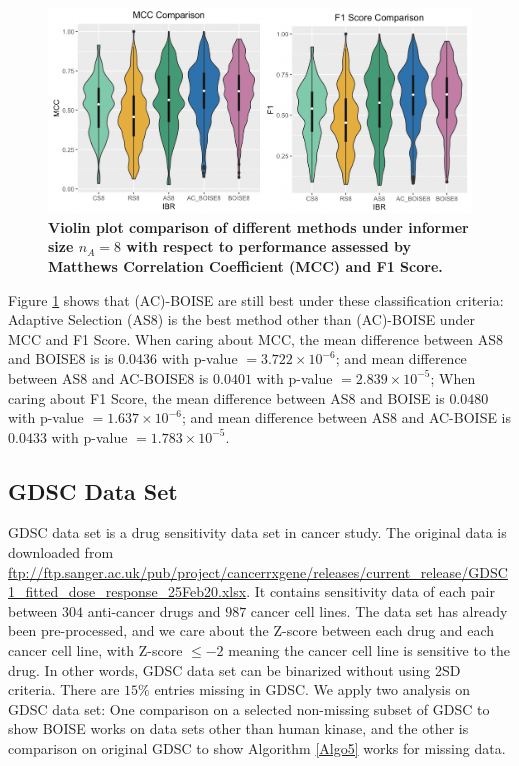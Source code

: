 \documentclass[12pt]{article}
\begin{document}
\begin{figure}[!ht]
\centering
\includegraphics[width=5.0in]{PKIS1_8_mccf1.png}
\caption{\label{fig:mcc} 
{\bf Violin plot comparison of different methods under informer size $n_A =8$ with respect to performance assessed by Matthews Correlation Coefficient (MCC) and F1 Score.} }
\end{figure}


Figure \ref{fig:mcc} shows that (AC)-BOISE are still best under these classification criteria: Adaptive Selection (AS8) is the best method other than (AC)-BOISE  under MCC and F1 Score. When caring about MCC, the mean difference between AS8 and BOISE8 is is $0.0436$ with p-value $=3.722\times 10^{-6}$; and  mean difference between AS8 and AC-BOISE8 is $0.0401$ with p-value $=2.839\times 10^{-5}$; When caring about F1 Score, the mean difference between AS8 and BOISE is $0.0480$ with p-value $=1.637\times 10^{-6}$; and  mean difference between AS8 and AC-BOISE is $0.0433$ with p-value $=1.783\times 10^{-5}$.


\subsection{GDSC Data Set}
GDSC data set is a drug sensitivity data set in cancer study. The original data is downloaded from \url{ftp://ftp.sanger.ac.uk/pub/project/cancerrxgene/releases/current_release/GDSC1_fitted_dose_response_25Feb20.xlsx}. It contains sensitivity data of each pair between $304$ anti-cancer drugs and $987$ cancer cell lines. The data set has already been pre-processed, and we care about the Z-score between each drug and each cancer cell line, with Z-score $\leq -2$ meaning the cancer cell line is sensitive to the drug. In other words, GDSC data set can be binarized without using 2SD criteria. There are $15\%$ entries missing in GDSC. We apply two analysis on GDSC data set: One comparison on a selected non-missing subset of GDSC to show BOISE works on data sets other than human kinase, and the other is comparison on original GDSC to show Algorithm \ref{Algo5} works for missing data. 
\end{document}
